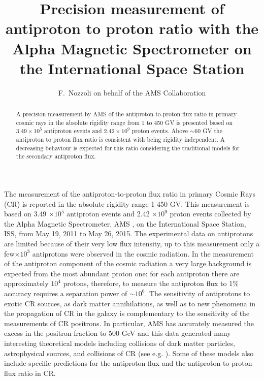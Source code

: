 \documentclass[twocolumn,twoside,slac_two]{revtex4-1}
\begin{document}
\title{Precision measurement of antiproton to proton ratio with the Alpha Magnetic Spectrometer on the International Space Station}


\author{F.~Nozzoli on behalf of the AMS Collaboration}

\begin{abstract}
  A precision measurement by AMS of the antiproton-to-proton flux ratio in
  primary cosmic rays in the absolute rigidity range from 1 to 450 GV is presented based on $3.49\times10^5$
  antiproton events and $2.42\times10^9$ proton events.
  Above $\sim60$ GV the antiproton to proton flux
  ratio is consistent with being rigidity independent. A decreasing behaviour is expected for this ratio considering the traditional models for the secondary antiproton flux. 
\end{abstract}

\maketitle

\thispagestyle{fancy}


The measurement of the antiproton-to-proton flux ratio in primary Cosmic
Rays (CR) is reported in the absolute rigidity range 1-450 GV. 
This measurement is based on 3.49 $\times 10^5$ antiproton events
and 2.42 $\times 10^9$ proton events collected by the Alpha Magnetic Spectrometer,
AMS
\cite{ref:AMS2_first,ref:AMS2_fraction,ref:AMS2_epfluxes,ref:AMS2_allele,ref:AMS2_protons,ref:AMS2_He,ref:AMS2_pbar,ref:AMS2_BC},
on the International Space Station, ISS, from May
19, 2011 to May 26, 2015.
%
The experimental data on antiprotons
are limited \cite{ref:BESS,ref:PAMELA} because of
their very low flux intensity, up to this measurement only
a few$\times 10^3$ antiprotons were observed in the cosmic radiation.
In the measurement of the antiproton component of the cosmic radiation a very large background is expected from the most abundant proton one:  
for each antiproton there are
approximately $10^4$ protons, therefore,
to measure the antiproton flux to 1$\%$ accuracy requires a
separation power of $\sim 10^6$. The sensitivity of antiprotons to
exotic CR sources, as dark matter annihilations, as well as to new
phenomena in the propagation of CR in the galaxy
is complementary to the sensitivity
of the measurements of CR positrons. In particular, AMS has accurately measured the excess in the
positron fraction to 500 GeV \cite{ref:AMS2_first,ref:AMS2_fraction} and
this data generated many interesting theoretical models
including collisions of dark matter particles, astrophysical sources,
and collisions of CR (see e.g.
\cite{ref:tom_last,ref:tom_bay,ref:tom_PHe,ref:tom_unc,ref:tom_2hal,ref:tom_cfE,ref:tom_posfra,ref:donato}).
Some of these models also
include specific predictions for the antiproton flux and the
antiproton-to-proton flux ratio in CR.
\end{document}

